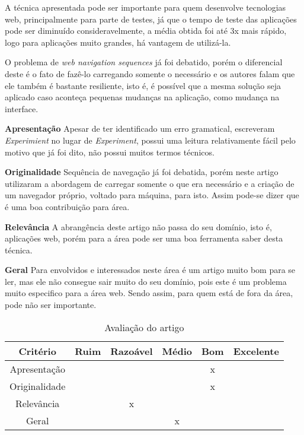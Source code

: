 \documentclass[conference]{IEEEtran}
\begin{document}
A técnica apresentada pode ser importante para quem desenvolve tecnologias web,
principalmente para parte de testes, já que o tempo de teste das aplicações pode
ser diminuído consideravelmente, a média obtida foi até 3x mais rápido, logo
para aplicações muito grandes, há vantagem de utilizá-la.

O problema de \emph{web navigation sequences} já foi debatido, porém o
diferencial deste é o fato de fazê-lo carregando somente o necessário e os
autores falam que ele também é bastante resiliente, isto é, é possível que a
mesma solução seja aplicado caso aconteça pequenas mudanças na aplicação, como
mudança na interface.

\textbf{Apresentação} Apesar de ter identificado um erro gramatical, escreveram
\emph{Experimient} no lugar de \emph{Experiment}, possui uma leitura
relativamente fácil pelo motivo que já foi dito, não possui muitos termos
técnicos.

\textbf{Originalidade} Sequência de navegação já foi debatida, porém neste
artigo\cite{art:main} utilizaram a abordagem de carregar somente o que era
necessário e a criação de um navegador próprio, voltado para máquina, para isto.
Assim pode-se dizer que é uma boa contribuição para área.

\textbf{Relevância} A abrangência deste artigo não passa do seu domínio, isto é,
aplicações web, porém para a área pode ser uma boa ferramenta saber desta
técnica.

\textbf{Geral} Para envolvidos e interessados neste área é um artigo muito bom
para se ler, mas ele não consegue sair muito do seu domínio, pois este é um
problema muito especifico para a área web. Sendo assim, para quem está de fora
da área, pode não ser importante.

\begin{table}[h]
  \centering
  \begin{tabular}{|c|c|c|c|c|c|}
    \hline
    \textbf{Critério} & \textbf{Ruim} & \textbf{Razoável} & \textbf{Médio}
    & \textbf{Bom} & \textbf{Excelente} \\
    \hline
    Apresentação & & & & x & \\
    \hline
    Originalidade & & & & x & \\
    \hline
    Relevância & & x & & & \\
    \hline
    Geral & & & x & & \\
    \hline
  \end{tabular}
  \caption{Avaliação do artigo\cite{art:main}}
  \label{tab:avaliacao}
\end{table}


\end{document}
